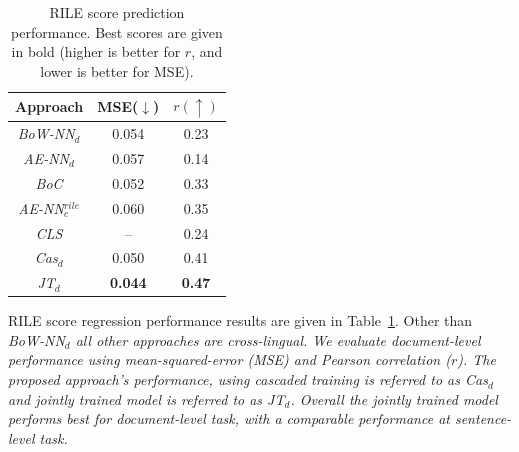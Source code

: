 \documentclass[11pt,a4paper]{article}
\newcommand{\tabref}[2][]{Table#1~\ref{#2}\xspace}
\begin{document}
 \begin{table}[!t]
  \centering
  \begin{tabular}{ c c c }
  \toprule
    Approach & MSE($\downarrow$) & $r(\uparrow)$\\
    \midrule
    \em{BoW-NN}$_{d}$  &   0.054 & 0.23\\
    \em{AE-NN}$_{d}$    & 0.057 & 0.14\\
    \em{BoC}    &  0.052 & 0.33\\
    \em{AE-NN}$_{c}^{rile}$   & 0.060 & 0.35\\
    \em{CLS}   & -- & 0.24\\
    \em{Cas}$_{d}$  &  0.050 & 0.41 \\
    \em{JT}$_{d}$ &  \textbf{0.044} & \textbf{0.47} \\
    \bottomrule
  \end{tabular}
  \caption{RILE score prediction performance. Best scores are given in bold %
(higher is better for $r$, and lower is better for MSE).}
  \label{tab:al1}
\end{table}

RILE score regression performance results are given in \tabref{tab:al1}. Other than \em{BoW-NN$_{d}$} \rm all other approaches are cross-lingual. We evaluate document-level performance using mean-squared-error (MSE) and Pearson correlation ($r$). The proposed approach's performance, using cascaded training  is referred to as \em{Cas}$_{d}$ \rm and jointly trained model is referred to as \em{JT}$_{d}$. \rm Overall the jointly trained model performs best for document-level task, with a comparable performance at sentence-level task. 

\end{document}
